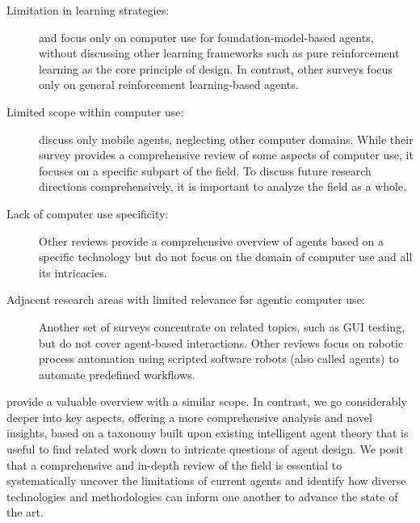 \begin{description}
    \item[Limitation in learning strategies:] \citet{zhang_large_2024} and \citet{wang_gui_2024} focus only on computer use for foundation-model-based agents, without discussing other learning frameworks such as pure reinforcement learning as the core principle of design. In contrast, 
    other surveys  focus only on general reinforcement learning-based agents.

    \item[Limited scope within computer use:] 
    \citet{wu_foundations_2024} discuss only mobile agents, neglecting other computer domains.
    While their survey provides a comprehensive review of some aspects of computer use, it focuses on a specific subpart of the field. To discuss future research directions comprehensively, it is important to analyze the field as a whole.
    \item[Lack of computer use specificity:]
    Other reviews  provide a comprehensive overview of agents based on a specific technology but do not focus on the domain of computer use and all its intricacies.
    \item[Adjacent research areas with limited relevance for agentic computer use:]
    Another set of surveys  concentrate on related topics, such as GUI testing, but do not cover agent-based interactions.
    Other reviews  focus on robotic process automation using scripted software robots (also called agents) to automate predefined workflows.
\end{description}

\citet{gao_generalist_2024} provide a valuable overview with a similar scope. In contrast, we go considerably deeper into key aspects, offering a more comprehensive analysis and novel insights, based on a taxonomy built upon existing intelligent agent theory \citep{russell_artificial_2022,sutton_reinforcement_2018} that is useful to find related work down to intricate questions of agent design. We posit that a comprehensive and in-depth review of the field is essential to systematically uncover the limitations of current agents and identify how diverse technologies and methodologies can inform one another to advance the state of the art.

